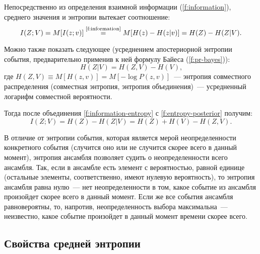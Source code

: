 \documentclass[12pt,a4paper,openright]{book}
\theoremstyle{definition}
\numberwithin{equation}{chapter}
\begin{document}
	Непосредственно из определения взаимной информации (\autoref{f:information}), среднего значения и энтропии вытекает соотношение:
	\begin{equation}\label{f:information-entropy}
		I(Z; V) = M[I(z; v)] \overset{\textup{\autoref{f:information}}}{=} M[H(z) - H(z | v)] = H(Z) - H(Z | V) \text{.}
	\end{equation}

	Можно также показать следующее (усреднением апостериорной энтропии события, предварительно применив к ней формулу Байеса (\autoref{f:pr-bayes})):
	\begin{equation}\label{f:entropy-posterior}
		H(Z | V) = H(Z, V) - H(V) \text{,}
	\end{equation}
	где $H(Z, V) \equiv M[H(z, v)] = M[- \log P(z, v)]$~--- энтропия совместного распределения (совместная энтропия, энтропия объединения)~--- усредненный логарифм совместной вероятности.

	Тогда после объединения \autoref{f:information-entropy} с \autoref{f:entropy-posterior} получим:
	\begin{equation}
		I(Z; V) = H(Z) - H(Z | V) = H(Z) + H(V) - H(Z, V) \text{.}
	\end{equation}

	В отличие от энтропии события, которая является мерой неопределенности конкретного события (случится оно или не случится скорее всего в данный момент), энтропия ансамбля позволяет судить о неопределенности всего ансамбля. Так, если в ансамбле есть элемент с вероятностью, равной единице (остальные элементы, соответственно, имеют нулевую вероятность), то энтропия ансамбля равна нулю~--- нет неопределенности в том, какое событие из ансамбля произойдет скорее всего в данный момент. Если же все события ансамбля равновероятны, то, напротив, неопределенность выбора максимальна~--- неизвестно, какое событие произойдет в данный момент времени скорее всего.




	\subsection{Свойства средней энтропии}
\end{document}
